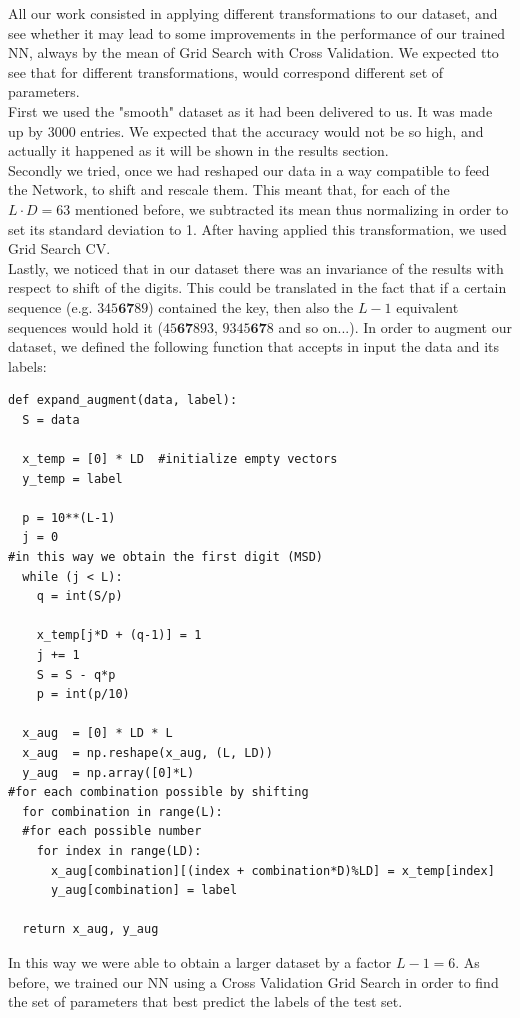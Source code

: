 \documentclass[prl,twocolumn]{revtex4-1}
\begin{document}
All our work consisted in applying different transformations to our dataset, and see whether it may lead to some improvements in the performance of our trained NN, always by the mean of Grid Search with Cross Validation. We expected tto see that for different transformations, would correspond different set of parameters.\\
First we used the "smooth" dataset as it had been delivered to us. It was made up by 3000 entries. We expected that the accuracy would not be so high, and actually it happened as it will be shown in the results section.\\
Secondly we tried, once we had reshaped our data in a way compatible to feed the Network, to shift and rescale them. This meant that, for each of the $L \cdot D = 63$ mentioned before, we subtracted its mean thus normalizing in order to set its standard deviation to 1. After having applied this transformation, we used Grid Search CV.\\
Lastly, we noticed that in our dataset there was an invariance of the results with respect to shift of the digits. This could be translated in the fact that if a certain sequence (e.g. $345\textbf{67}89$) contained the key, then also the $L-1$ equivalent sequences would hold it ($45\textbf{67}893$, $9345\textbf{67}8$ and so on...). In order to augment our dataset, we defined the following function that accepts in input the data and its labels:
\begin{verbatim}
def expand_augment(data, label):
  S = data

  x_temp = [0] * LD  #initialize empty vectors
  y_temp = label

  p = 10**(L-1)
  j = 0
#in this way we obtain the first digit (MSD)
  while (j < L):  
    q = int(S/p)

    x_temp[j*D + (q-1)] = 1
    j += 1
    S = S - q*p
    p = int(p/10)

  x_aug  = [0] * LD * L
  x_aug  = np.reshape(x_aug, (L, LD))
  y_aug  = np.array([0]*L)
#for each combination possible by shifting
  for combination in range(L): 
  #for each possible number 
    for index in range(LD): 
      x_aug[combination][(index + combination*D)%LD] = x_temp[index]
      y_aug[combination] = label 

  return x_aug, y_aug
\end{verbatim}
In this way we were able to obtain a larger dataset by a factor $L-1 = 6$. As before, we trained our NN using a Cross Validation Grid Search in order to find the set of parameters that best predict the labels of the test set.
\end{document}
